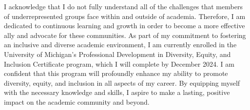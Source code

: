 \documentclass[11pt]{article}
\begin{document}



I acknowledge that I do not fully understand all of the challenges that members of underrepresented groups face within and outside of academia.
Therefore, I am dedicated to continuous learning and growth in order to become a more effective ally and advocate for these communities.
As part of my commitment to fostering an inclusive and diverse academic environment, I am currently enrolled in the University of Michigan's Professional Development in Diversity, Equity, and Inclusion Certificate program, which I will complete by December 2024.
I am confident that this program will profoundly enhance my ability to promote diversity, equity, and inclusion in all aspects of my career.
By equipping myself with the necessary knowledge and skills, I aspire to make a lasting, positive impact on the academic community and beyond.
\end{document}

